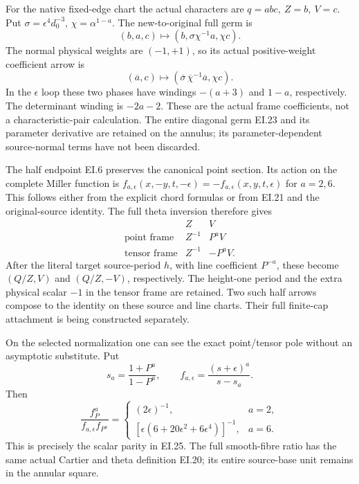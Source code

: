 For the native fixed-edge chart the actual characters are
\(q=abc,\ Z=b,\ V=c\). Put
\(\sigma=\epsilon^4d_0^{-3}\), \(\chi=\alpha^{1-a}\).
The new-to-original full germ is
\[
 (b,a,c)\longmapsto
       (b,\sigma\chi^{-1}a,\chi c).
 \tag{EI.23}
\]
The normal physical weights are \((-1,+1)\), so its actual
positive-weight coefficient arrow is
\[
 (\overline a,c)\longmapsto
      (\overline\sigma\,\overline\chi^{-1}\overline a,\chi c).
 \tag{EI.24}
\]
In the \(\epsilon\) loop these two phases have windings
\(-(a+3)\) and \(1-a\), respectively. The determinant
winding is \(-2a-2\). These are the actual frame coefficients,
not a characteristic-pair calculation. The entire diagonal
germ EI.23 and its parameter derivative are retained on the
annulus; its parameter-dependent source-normal terms have not
been discarded.

The half endpoint EI.6 preserves the canonical point section.
Its action on the complete Miller function is
\(f_{a,\epsilon}(x,-y,t,-\epsilon)=-f_{a,\epsilon}(x,y,t,\epsilon)\)
for \(a=2,6\). This follows either from the explicit chord
formulas or from EI.21 and the original-source identity.
The full theta inversion therefore gives
\[
 \begin{array}{c|cc}
 &Z&V\\ \hline
 \text{point frame}&Z^{-1}&P^aV\\
 \text{tensor frame}&Z^{-1}&-P^aV .
 \end{array}
 \tag{EI.25}
\]
After the literal target source-period \(h\), with line
coefficient \(P^{-a}\), these become \((Q/Z,V)\) and
\((Q/Z,-V)\), respectively. The height-one period and the
extra physical scalar \(-1\) in the tensor frame are retained.
Two such half arrows compose to the identity on these source
and line charts. Their full finite-cap attachment is being
constructed separately.

On the selected normalization one can see the exact point/tensor
pole without an asymptotic substitute. Put
\[
 s_a=\frac{1+P^a}{1-P^a},\qquad
 f_{a,\epsilon}=\frac{(s+\epsilon)^a}{s-s_a}.
 \tag{EI.26}
\]
Then
\[
 \frac{f_P^a}{f_{a,\epsilon}f_{P^a}}
 =\begin{cases}
 (2\epsilon)^{-1},&a=2,\\
 [\epsilon(6+20\epsilon^2+6\epsilon^4)]^{-1},&a=6 .
 \end{cases}
 \tag{EI.27}
\]
This is precisely the scalar parity in EI.25. The full smooth-fibre
ratio has the same actual Cartier and theta definition EI.20;
its entire source-base unit remains in the annular square.


